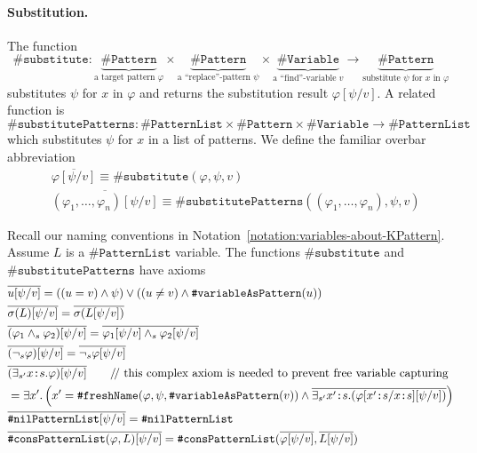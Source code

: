 \documentclass[UTF8,11pt]{article}
\theoremstyle{plain}
\theoremstyle{definition}
\theoremstyle{remark}
\newcommand{\cln}{\texttt{:}}
\newcommand{\doubleslash}{/\!/{ }}
\newcommand{\sharpsymbol}{\#}
\newcommand{\KPatternList}{\texttt{\sharpsymbol PatternList}}
\newcommand{\KnilKPatternList}{\texttt{\sharpsymbol nilPatternList}}
\newcommand{\KconsKPatternList}{\texttt{\sharpsymbol consPatternList}}
\newcommand{\KVariable}{\texttt{\sharpsymbol Variable}}
\newcommand{\KVariableAsKPattern}{\texttt{\sharpsymbol variableAsPattern}}
\newcommand{\KPattern}{\texttt{\sharpsymbol Pattern}}
\newcommand{\KfreshName}{\texttt{\sharpsymbol freshName}}
\newcommand{\Ksubstitute}{\texttt{\sharpsymbol substitute}}
\newcommand{\KsubstitutePatterns}{\texttt{\sharpsymbol substitutePatterns}}
\begin{document}
\paragraph{Substitution.}
The function
$$\Ksubstitute \colon \underbrace{\KPattern}_\text{a target pattern $\varphi$} 
\times \underbrace{\KPattern}_\text{a ``replace''-pattern $\psi$} \times 
\underbrace{\KVariable}_\text{a ``find''-variable $v$} \to 
\underbrace{\KPattern}_\text{substitute $\psi$ for $x$ in $\varphi$}$$
substitutes $\psi$ for $x$ in $\varphi$ and returns the substitution result 
$\varphi[\psi / v]$.
A related function is 
$$\KsubstitutePatterns \colon \KPatternList \times \KPattern \times \KVariable 
\to \KPatternList$$
which substitutes $\psi$ for $x$ in a list of patterns.
We define the familiar overbar abbreviation 
\begin{align*}
& \overline{\varphi[\psi / v]} \equiv \Ksubstitute(\varphi, \psi, v) \\
& \overline{(\varphi_1,\dots,\varphi_n)[\psi / v]} \equiv 
\KsubstitutePatterns((\varphi_1,\dots,\varphi_n), \psi, v)
\end{align*}

Recall our naming conventions in 
Notation~\ref{notation:variables-about-KPattern}.
Assume $L$ is a $\KPatternList$ variable.
The functions $\Ksubstitute$ and $\KsubstitutePatterns$ have axioms
\begin{align*}
  & \overline{u [\psi / v]} 
  = ((u = v) \wedge \psi)
  \vee ((u \neq v) \wedge \KVariableAsKPattern(u))
  \\
  & \overline{\sigma(L)[\psi / v]} =
  \overline{\sigma(L[\psi / v])}
  \\
  & \overline{(\varphi_1 \wedge_{s} \varphi_2) [\psi / v]} = 
  \overline{\varphi_1[\psi / v] \wedge_{s} \varphi_2[\psi / v]}
  \\
  & \overline{(\neg_{s} \varphi)[\psi / v]} = \overline{\neg_{s} \varphi[\psi 
  / v]}
  \\
  & \overline{(\exists_{s'} x \cln s . \varphi)[\psi/v]} 
  \qquad \text{\doubleslash this complex axiom is needed to 
  	prevent {free variable capturing}}\\
  & = \exists x' . \left(x' = \KfreshName(\varphi, \psi, 
  \KVariableAsKPattern(v)) \wedge \overline{\exists_{s'} x' \cln s . 
  (\varphi[x' \cln s / x \cln s][\psi/v])}\right)
  \\
  & \overline{\KnilKPatternList[\psi / v]} = \KnilKPatternList
  \\
  & \overline{\KconsKPatternList(\varphi, L)[\psi / v]} = 
  \KconsKPatternList(\overline{\varphi[\psi / v]}, \overline{L[\psi / v]})
\end{align*}
\end{document}
